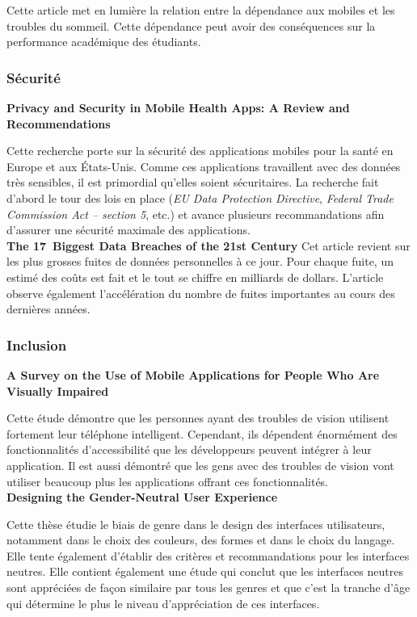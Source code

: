 		Cette article met en lumière la relation entre la dépendance aux mobiles et les troubles du sommeil. Cette dépendance peut avoir des conséquences sur la performance académique des étudiants.
				
		\subsubsection{Sécurité}
		{\bfseries \cite{privacy} Privacy and Security in Mobile Health Apps: A Review and Recommendations}
		
		Cette recherche porte sur la sécurité des applications mobiles pour la santé en Europe et aux États-Unis. Comme ces applications travaillent avec des données très sensibles, il est primordial qu'elles soient sécuritaires. La recherche fait d'abord le tour des lois en place (\emph{EU Data Protection Directive}, \emph{Federal Trade Commission Act -- section 5}, etc.) et avance plusieurs recommandations afin d'assurer une sécurité maximale des applications. \\
		
		{\bfseries \cite{dataBreach} The 17~Biggest Data Breaches of the 21st Century}
		Cet article revient sur les plus grosses fuites de données personnelles à ce jour. Pour chaque fuite, un estimé des coûts est fait et le tout se chiffre en milliards de dollars. L'article observe également l'accélération du nombre de fuites importantes au cours des dernières années.
		
		\subsubsection{Inclusion}
		{\bfseries \cite{visuallyImpaired} A Survey on the Use of Mobile Applications for People Who Are Visually Impaired}
		
		Cette étude démontre que les personnes ayant des troubles de vision utilisent fortement leur téléphone intelligent. Cependant, ils dépendent énormément des fonctionnalités d'accessibilité que les développeurs peuvent intégrer à leur application. Il est aussi démontré que les gens avec des troubles de vision vont utiliser beaucoup plus les applications offrant ces fonctionnalités. \\
		
		{\bfseries \cite{genderNeutral} Designing the Gender-Neutral User Experience}
		
		Cette thèse étudie le biais de genre dans le design des interfaces utilisateurs, notamment dans le choix des couleurs, des formes et dans le choix du langage. Elle tente également d'établir des critères et recommandations pour les interfaces neutres. Elle contient également une étude qui conclut que les interfaces neutres sont appréciées de façon similaire par tous les genres et que c'est la tranche d'âge qui détermine le plus le niveau d'appréciation de ces interfaces.
		
